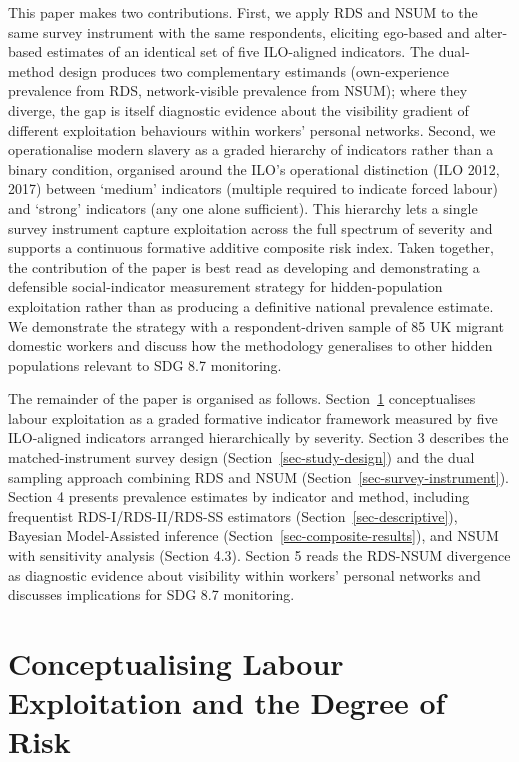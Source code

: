 \documentclass[
  12pt,
  letterpaper,
  DIV=11,
  numbers=noendperiod]{scrartcl}
\begin{document}
This paper makes two contributions. First, we apply RDS and NSUM to the
same survey instrument with the same respondents, eliciting ego-based
and alter-based estimates of an identical set of five ILO-aligned
indicators. The dual-method design produces two complementary estimands
(own-experience prevalence from RDS, network-visible prevalence from
NSUM); where they diverge, the gap is itself diagnostic evidence about
the visibility gradient of different exploitation behaviours within
workers' personal networks. Second, we operationalise modern slavery as
a graded hierarchy of indicators rather than a binary condition,
organised around the ILO's operational distinction (ILO 2012, 2017)
between `medium' indicators (multiple required to indicate forced
labour) and `strong' indicators (any one alone sufficient). This
hierarchy lets a single survey instrument capture exploitation across
the full spectrum of severity and supports a continuous formative
additive composite risk index. Taken together, the contribution of the
paper is best read as developing and demonstrating a defensible
social-indicator measurement strategy for hidden-population exploitation
rather than as producing a definitive national prevalence estimate. We
demonstrate the strategy with a respondent-driven sample of 85 UK
migrant domestic workers and discuss how the methodology generalises to
other hidden populations relevant to SDG 8.7 monitoring.

The remainder of the paper is organised as follows.
Section~\ref{sec-conceptualisation} conceptualises labour exploitation
as a graded formative indicator framework measured by five ILO-aligned
indicators arranged hierarchically by severity. Section 3 describes the
matched-instrument survey design (Section~\ref{sec-study-design}) and
the dual sampling approach combining RDS and NSUM
(Section~\ref{sec-survey-instrument}). Section 4 presents prevalence
estimates by indicator and method, including frequentist
RDS-I/RDS-II/RDS-SS estimators (Section~\ref{sec-descriptive}), Bayesian
Model-Assisted inference (Section~\ref{sec-composite-results}), and NSUM
with sensitivity analysis (Section 4.3). Section 5 reads the RDS-NSUM
divergence as diagnostic evidence about visibility within workers'
personal networks and discusses implications for SDG 8.7 monitoring.

\section{Conceptualising Labour Exploitation and the Degree of
Risk}\label{sec-conceptualisation}
\end{document}

